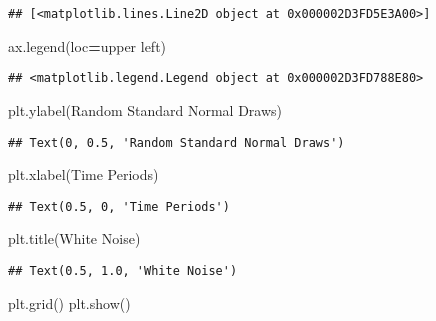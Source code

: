\documentclass[
]{book}
\newenvironment{Shaded}{\begin{snugshade}}{\end{snugshade}}
\newcommand{\NormalTok}[1]{#1}
\newcommand{\OperatorTok}[1]{\textcolor[rgb]{0.81,0.36,0.00}{\textbf{#1}}}
\newcommand{\StringTok}[1]{\textcolor[rgb]{0.31,0.60,0.02}{#1}}
\begin{document}
\begin{verbatim}
## [<matplotlib.lines.Line2D object at 0x000002D3FD5E3A00>]
\end{verbatim}

\begin{Shaded}
\begin{Highlighting}[]
\NormalTok{ax.legend(loc}\OperatorTok{=}\StringTok{\textquotesingle{}upper left\textquotesingle{}}\NormalTok{)}
\end{Highlighting}
\end{Shaded}

\begin{verbatim}
## <matplotlib.legend.Legend object at 0x000002D3FD788E80>
\end{verbatim}

\begin{Shaded}
\begin{Highlighting}[]
\NormalTok{plt.ylabel(}\StringTok{\textquotesingle{}Random Standard Normal Draws\textquotesingle{}}\NormalTok{)}
\end{Highlighting}
\end{Shaded}

\begin{verbatim}
## Text(0, 0.5, 'Random Standard Normal Draws')
\end{verbatim}

\begin{Shaded}
\begin{Highlighting}[]
\NormalTok{plt.xlabel(}\StringTok{\textquotesingle{}Time Periods\textquotesingle{}}\NormalTok{)}
\end{Highlighting}
\end{Shaded}

\begin{verbatim}
## Text(0.5, 0, 'Time Periods')
\end{verbatim}

\begin{Shaded}
\begin{Highlighting}[]
\NormalTok{plt.title(}\StringTok{\textquotesingle{}White Noise\textquotesingle{}}\NormalTok{)}
\end{Highlighting}
\end{Shaded}

\begin{verbatim}
## Text(0.5, 1.0, 'White Noise')
\end{verbatim}

\begin{Shaded}
\begin{Highlighting}[]
\NormalTok{plt.grid()}
\NormalTok{plt.show()}
\end{Highlighting}
\end{Shaded}
\end{document}
